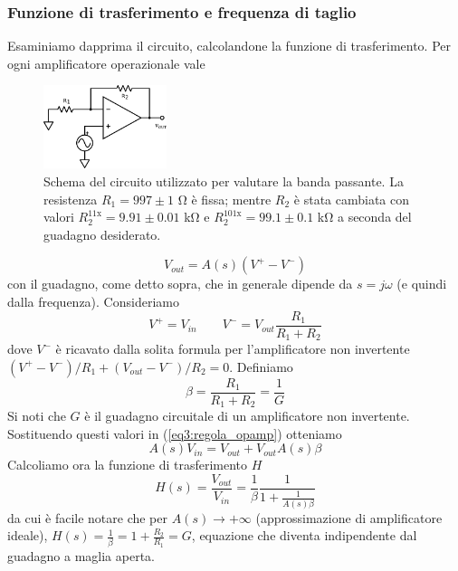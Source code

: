 \subsubsection*{Funzione di trasferimento e frequenza di taglio}

Esaminiamo dapprima il circuito, calcolandone la funzione di trasferimento. Per ogni amplificatore operazionale vale
\begin{figure}
  \begin{center}
    \includegraphics[width=0.32\textwidth]{../E03/latex/bandwidth.pdf}
  \end{center}
  \caption{Schema del circuito utilizzato per valutare la banda passante. La resistenza $R_1=997\pm1$ \si{\ohm} è fissa; mentre $R_2$ è stata cambiata con valori $R_2^{11\mathrm{x}}=9.91 \pm 0.01$ \si{\kilo\ohm} e $R_2^{101\mathrm{x}}=99.1 \pm 0.1$ \si{\kilo\ohm} a seconda del guadagno desiderato.}
  \label{cir3:banda}
\end{figure}
\begin{equation}
V_{out}=A(s) (V^+-V^-)
\label{eq3:regola_opamp}
\end{equation}
con il guadagno, come detto sopra, che in generale dipende da $s=j\omega$ (e quindi dalla frequenza). Consideriamo
$$V^+ = V_{in} \qquad V^-=V_{out} \frac{R_1}{R_1+R_2}$$
dove $V^-$ è ricavato dalla solita formula per l'amplificatore non invertente $(V^+-V^-)/R_1 + (V_{out}-V^-)/R_2 =0$. Definiamo
$$\beta = \frac{R_1}{R_1+R_2} = \frac{1}{G}$$
Si noti che $G$ è il guadagno circuitale di un amplificatore non invertente. Sostituendo questi valori in (\ref{eq3:regola_opamp}) otteniamo
$$A(s) V_{in} = V_{out} + V_{out} A(s) \beta$$
Calcoliamo ora la funzione di trasferimento $H$
\begin{equation}
H(s)=\frac{V_{out}}{V_{in}}=\frac{1}{\beta}\frac{1}{1+\frac{1}{A(s) \beta}}
\label{eq3:funz_trasfe}
\end{equation}
da cui è facile notare che per $A(s) \rightarrow + \infty$ (approssimazione di amplificatore ideale), $H(s)=\frac{1}{\beta}=1+\frac{R_2}{R_1}=G$, equazione che diventa indipendente dal guadagno a maglia aperta.

